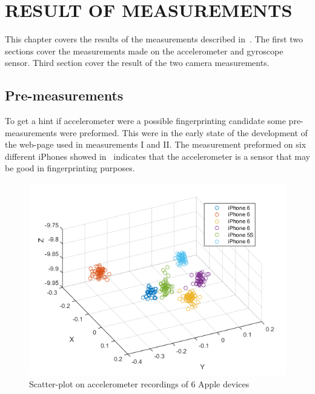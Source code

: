 \chapter{RESULT OF MEASUREMENTS}\label{cha:result}
This chapter covers the results of the measurements described in~. The first two sections cover the measurements made on the accelerometer and gyroscope sensor. Third section cover the result of the two camera measurements.

\section{Pre-measurements}
To get a hint if accelerometer were a possible fingerprinting candidate some pre-measurements were preformed. This were in the early state of the development of the web-page used in measurements I and II. The measurement preformed on six different iPhones showed in~ indicates that the accelerometer is a sensor that may be good in fingerprinting purposes.
\begin{figure}[H]
\centering
\includegraphics[scale=.6]{img/scatteriPhone}
\caption{Scatter-plot on accelerometer recordings of 6 Apple devices}
\label{fig:iPhoneScatter}
\end{figure}

